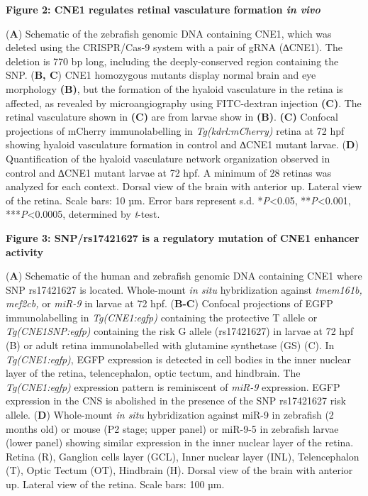 \documentclass[]{article}
\begin{document}
\textbf{Figure 2: CNE1 regulates retinal vasculature formation \emph{in
vivo}}

(\textbf{A}) Schematic of the zebrafish genomic DNA containing CNE1,
which was deleted using the CRISPR/Cas-9 system with a pair of gRNA
(∆CNE1). The deletion is 770 bp long, including the deeply-conserved
region containing the SNP. (\textbf{B, C}) CNE1 homozygous mutants
display normal brain and eye morphology \textbf{(B)}, but the formation
of the hyaloid vasculature in the retina is affected, as revealed by
microangiography using FITC-dextran injection \textbf{(C)}. The retinal
vasculature shown in \textbf{(C)} are from larvae show in \textbf{(B)}.
\textbf{(C)} Confocal projections of mCherry immunolabelling in
\emph{Tg(kdrl:mCherry)} retina at 72 hpf showing hyaloid vasculature
formation in control and ∆CNE1 mutant larvae. (\textbf{D})
Quantification of the hyaloid vasculature network organization observed
in control and ∆CNE1 mutant larvae at 72 hpf. A minimum of 28 retinas
was analyzed for each context. Dorsal view of the brain with anterior
up. Lateral view of the retina. Scale bars: 10 µm. Error bars represent
s.d. *\emph{P}\textless{}0.05, **\emph{P}\textless{}0.001,
***\emph{P}\textless{}0.0005, determined by \emph{t}-test.

\textbf{Figure 3: SNP/rs17421627 is a regulatory mutation of CNE1
enhancer activity }

(\textbf{A}) Schematic of the human and zebrafish genomic DNA containing
CNE1 where SNP rs17421627 is located. Whole-mount \emph{in situ}
hybridization against \emph{tmem161b, mef2cb,} or \emph{miR-9} in larvae
at 72 hpf. (\textbf{B-C}) Confocal projections of EGFP immunolabelling
in \emph{Tg(CNE1:egfp)} containing the protective T allele or
\emph{Tg(CNE1SNP:egfp)} containing the risk G allele (rs17421627) in
larvae at 72 hpf (B) or adult retina immunolabelled with glutamine
synthetase (GS) (C). In \emph{Tg(CNE1:egfp)}, EGFP expression is
detected in cell bodies in the inner nuclear layer of the retina,
telencephalon, optic tectum, and hindbrain. The \emph{Tg(CNE1:egfp)}
expression pattern is reminiscent of \emph{miR-9} expression. EGFP
expression in the CNS is abolished in the presence of the SNP rs17421627
risk allele. (\textbf{D}) Whole-mount \emph{in situ} hybridization
against miR-9 in zebrafish (2 months old) or mouse (P2 stage; upper
panel) or miR-9-5 in zebrafish larvae (lower panel) showing similar
expression in the inner nuclear layer of the retina. Retina (R),
Ganglion cells layer (GCL), Inner nuclear layer (INL), Telencephalon
(T), Optic Tectum (OT), Hindbrain (H). Dorsal view of the brain with
anterior up. Lateral view of the retina. Scale bars: 100 µm.
\end{document}
